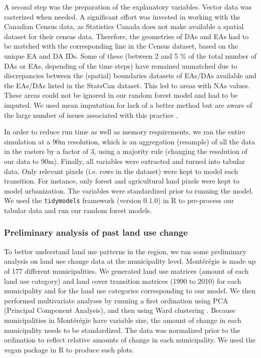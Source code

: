 A second step was the preparation of the explanatory variables. Vector data was rasterized when needed. A significant effort was invested in working with the Canadian Census data, as Statistics Canada does not make available a spatial dataset for their census data. Therefore, the geometries of DAs and EAs had to be matched with the corresponding line in the Census dataset, based on the unique EA and DA IDs. Some of these (between 2 and 5 \% of the total number of DAs or EAs, depending of the time steps) have remained unmatched due to discrepancies between the (spatial) boundaries datasets of EAs/DAs available and the EAs/DAs listed in the StatsCan dataset. This led to areas with NAs values. These areas could not be ignored in our random forest model and had to be imputed. We used mean imputation for lack of a better method but are aware of the large number of issues associated with this practice \citep[see][]{lodder_impute_2014}.

In order to reduce run time as well as memory requirements, we ran the entire simulation at a 90m resolution, which is an aggregation (resample) of all the data in the rasters by a factor of 3, using a majority rule (changing the resolution of our data to 90m). Finally, all variables were extracted and turned into tabular data. Only relevant pixels (i.e. rows in the dataset) were kept to model each transition. For instance, only forest and agricultural land pixels were kept to model urbanization. The variables were standardized prior to running the model. We used the \verb|tidymodels| framework (version 0.1.0) in R to pre-process our tabular data and run our random forest models. \\

\subsubsection{Preliminary analysis of past land use change}

To better understand land use patterns in the region, we ran some preliminary analysis on land use change data at the municipality level. Montérégie is made up of 177 different municipalities. We generated land use matrices (amount of each land use category) and land cover transition matrices (1990 to 2010) for each municipality and for the land use categories corresponding to our model. We then performed multivariate analyses by running a first ordination using PCA (Principal Component Analysis), and then using Ward clustering \citep{legendre_ordination_2012}.
Because municipalities in Montérégie have variable size, the amount of change in each municipality needs to be standardized. The data was normalized prior to the ordination to reflect relative amounts of change in each municipality. We used the vegan package in R to produce such plots.\\


